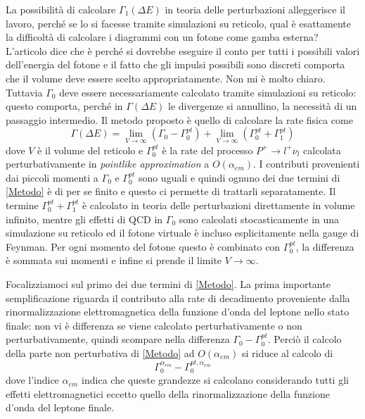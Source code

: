 \documentclass[LaM]{sapthesis}
\begin{document}
	La possibilità di calcolare $\Gamma_1(\Delta E)$ in teoria delle perturbazioni alleggerisce il lavoro, perché se lo si facesse tramite simulazioni su reticolo, \color{red} qual è esattamente la difficoltà di calcolare i diagrammi con un fotone come gamba esterna? L'articolo dice che è perché si dovrebbe eseguire il conto per tutti i possibili valori dell'energia del fotone e il fatto che gli impulsi possibili sono discreti comporta che il volume deve essere scelto appropriatamente. Non mi è molto chiaro\color{black}. Tuttavia $\Gamma_0$ deve essere necessariamente calcolato tramite simulazioni su reticolo: questo comporta, perché in $\Gamma(\Delta E)$ le divergenze si annullino, la necessità di un passaggio intermedio. Il metodo proposto è quello di calcolare la rate fisica come
	\begin{equation}
	\label{Metodo}
	\Gamma(\Delta E) = \lim_{V\to \infty}(\Gamma_0 -\Gamma_0^{pt})+\lim_{V\to \infty}(\Gamma_0^{pt} +\Gamma_1^{pt})
	\end{equation}
	dove $V$ è il volume del reticolo e $\Gamma_0^{pt}$ è la rate del processo $P^+\to l^+\nu_l$ calcolata perturbativamente in \emph{pointlike approximation} a $O(\alpha_{em})$. I contributi provenienti dai piccoli momenti a $\Gamma_0$ e $\Gamma_0^{pt}$ sono uguali e quindi ognuno dei due termini di \eqref{Metodo} è di per se finito e questo ci permette di trattarli separatamente. Il termine $\Gamma_0^{pt} +\Gamma_1^{pt}$ è calcolato in teoria delle perturbazioni direttamente in volume infinito, mentre gli effetti di QCD in $\Gamma_0$ sono calcolati stocasticamente in una simulazione su reticolo ed il fotone virtuale è incluso esplicitamente nella gauge di Feynman. Per ogni momento del fotone questo è combinato con $\Gamma_0^{pt}$, \color{red}la differenza è sommata sui momenti e infine si prende il limite $V\to\infty$\color{black}.
	
	Focalizziamoci sul primo dei due termini di \eqref{Metodo}. La prima importante semplificazione riguarda il contributo alla rate di decadimento proveniente dalla rinormalizzazione elettromagnetica della funzione d'onda del leptone nello stato finale: non vi è differenza se viene calcolato perturbativamente o non perturbativamente, quindi scompare nella differenza $\Gamma_0 -\Gamma_0^{pt}$. Perciò il calcolo della parte non perturbativa di \eqref{Metodo} ad $O(\alpha_{em})$ si riduce al calcolo di
	\begin{equation*}
	\Gamma_0^{\alpha_{em}}-\Gamma_0^{pt,\alpha_{em}}
	\end{equation*}
	dove l'indice $\alpha_{em}$ indica che queste grandezze si calcolano considerando tutti gli effetti elettromagnetici eccetto quello della rinormalizzazione della funzione d'onda del leptone finale.
	
\end{document}
